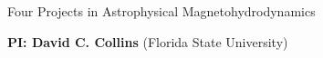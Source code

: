 \documentclass[11pt]{NSF}  %
\begin{document}
\begin{centering}
\begin{LARGE}
    Four Projects in Astrophysical Magnetohydrodynamics
\end{LARGE}

\renewcommand{\section}[1]{\red{#1}}
\vspace{2mm}
{\bf PI: David C. Collins} (Florida State University)

\end{centering}
\pagestyle{plain}

%
%
%

%


%



\end{document}

